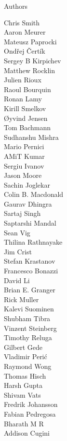 \begin{frame}{Authors}
\begin{multicols}{5}
\tiny
Chris Smith\\
Aaron Meurer\\
Mateusz Paprocki\\
Ondřej Čertík\\
Sergey B Kirpichev\\
Matthew Rocklin\\
Julien Rioux\\
Raoul Bourquin\\
Ronan Lamy\\
Kirill Smelkov\\
Øyvind Jensen\\
Tom Bachmann\\
Sudhanshu Mishra\\
Mario Pernici\\
AMiT Kumar\\
Sergiu Ivanov\\
Jason Moore\\
Sachin Joglekar\\
Colin B. Macdonald\\
Gaurav Dhingra\\
Sartaj Singh\\
Saptarshi Mandal\\
Sean Vig\\
Thilina Rathnayake\\
Jim Crist\\
Stefan Krastanov\\
Francesco Bonazzi\\
David Li\\
Brian E. Granger\\
Rick Muller\\
Kalevi Suominen\\
Shubham Tibra\\
Vinzent Steinberg\\
Timothy Reluga\\
Gilbert Gede\\
Vladimir Perić\\
Raymond Wong\\
Thomas Hisch\\
Harsh Gupta\\
Shivam Vats\\
Fredrik Johansson\\
Fabian Pedregosa\\
Bharath M R\\
Addison Cugini\\

\end{multicols}
\end{frame}
